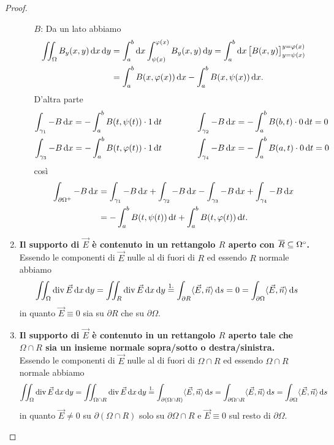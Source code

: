 \begin{proof}
\begin{enumerate}[label = \arabic*.]
\begin{enumerate}
			\item[$ B $:] Da un lato abbiamo 
			\begin{align*}
				\iint_{\Omega} B_y(x, y) \dif{x} \dif{y} & = \int_{a}^{b} \dif{x} \int_{\psi(x)}^{\varphi(x)} B_y(x, y) \dif{y} = \int_{a}^{b} \dif{x} \left[B(x, y)\right]_{y = \psi(x)}^{y = \varphi(x)} \\
				& = \int_{a}^{b} B(x, \varphi(x)) \dif{x} - \int_{a}^{b} B(x, \psi(x)) \dif{x}.
			\end{align*}
			D'altra parte 
			\begin{align*}
				\int_{\gamma_1} -B \dif{x} = - \int_{a}^{b} B(t, \psi(t)) \cdot 1 \dif{t} & \qquad \qquad \int_{\gamma_2} -B \dif{x} = - \int_{a}^{b} B(b, t) \cdot 0 \dif{t} = 0 \\
				\int_{\gamma_3} -B \dif{x} = - \int_{a}^{b} B(t, \varphi(t)) \cdot 1 \dif{t} & \qquad \qquad \int_{\gamma_4} -B \dif{x} = - \int_{a}^{b} B(a, t) \cdot 0 \dif{t} = 0
			\end{align*}
			così
			\begin{align*}
				\int_{\partial \Omega^+} - B \dif{x} & = \int_{\gamma_1} -B \dif{x} + \int_{\gamma_2} -B \dif{x} - \int_{\gamma_3} -B \dif{x} + \int_{\gamma_4} -B \dif{x} \\
				& = - \int_{a}^{b} B(t, \psi(t)) \dif{t} + \int_{a}^{b} B(t, \varphi(t)) \dif{t}. \\
			\end{align*}
		\end{enumerate}
		
		\item \textbf{Il supporto di $ \vec{E} $ è contenuto in un rettangolo $ R $ aperto con $ \overline{R} \subseteq {\Omega}^{\circ} $.} \\
		Essendo le componenti di $ \vec{E} $ nulle al di fuori di $ R $ ed essendo $ R $ normale abbiamo 
		\[
			\iint_{\Omega} \div{\vec{E}} \dif{x} \dif{y} = \iint_{R} \div{\vec{E}} \dif{x} \dif{y} \overset{\text{1.}}{=} \int_{\partial R} \langle {\vec{E}, \vec{n}} \rangle \dif{s} = 0 = \int_{\partial \Omega} \langle {\vec{E}, \vec{n}} \rangle \dif{s}
		\]
		in quanto $ \vec{E} \equiv 0 $ sia su $ \partial R $ che su $ \partial \Omega $. \\
		
		\item \textbf{Il supporto di $ \vec{E} $ è contenuto in un rettangolo $ R $ aperto tale che $ \Omega \cap R $ sia un insieme normale sopra/sotto o destra/sinistra.} \\
		Essendo le componenti di $ \vec{E} $ nulle al di fuori di $ \Omega \cap R $ ed essendo $ \Omega \cap R $ normale abbiamo 
		\[
			\iint_{\Omega} \div{\vec{E}} \dif{x} \dif{y} = \iint_{\Omega \cap R} \div{\vec{E}} \dif{x} \dif{y} \overset{\text{1.}}{=} \int_{\partial(\Omega \cap R)} \langle {\vec{E}, \vec{n}} \rangle \dif{s} = \int_{\partial\Omega \cap R} \langle {\vec{E}, \vec{n}} \rangle \dif{s} = \int_{\partial \Omega} \langle {\vec{E}, \vec{n}} \rangle \dif{s}
		\]
		in quanto $ \vec{E} \neq 0 $ su $ \partial(\Omega \cap R) $  solo su $ \partial\Omega \cap R $ e $ \vec{E} \equiv 0 $ sul resto di $ \partial \Omega $. \\
		

\end{enumerate}
\end{proof}
